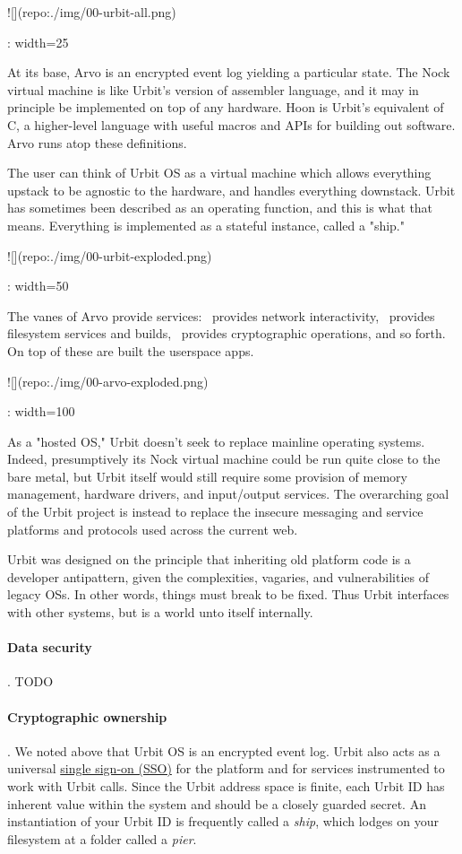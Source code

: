 ![](repo:./img/00-urbit-all.png){: width=25%

At its base, Arvo is an encrypted event log yielding a particular state.  The Nock virtual machine is like Urbit's version of assembler language, and it may in principle be implemented on top of any hardware.  Hoon is Urbit's equivalent of C, a higher-level language with useful macros and APIs for building out software.  Arvo runs atop these definitions.

The user can think of Urbit OS as a virtual machine which allows everything upstack to be agnostic to the hardware, and handles everything downstack.  Urbit has sometimes been described as an operating function, and this is what that means.  Everything is implemented as a stateful instance, called a "ship."

![](repo:./img/00-urbit-exploded.png){: width=50%

The vanes of Arvo provide services:  \ames~provides network interactivity, \clay~provides filesystem services and builds, \jael~provides cryptographic operations, and so forth.  On top of these are built the userspace apps.

![](repo:./img/00-arvo-exploded.png){: width=100%

As a "hosted OS," Urbit doesn't seek to replace mainline operating systems.  Indeed, presumptively its Nock virtual machine could be run quite close to the bare metal, but Urbit itself would still require some provision of memory management, hardware drivers, and input/output services.  The overarching goal of the Urbit project is instead to replace the insecure messaging and service platforms and protocols used across the current web.

Urbit was designed on the principle that inheriting old platform code is a developer antipattern, given the complexities, vagaries, and vulnerabilities of legacy OSs.  In other words, things must break to be fixed.  Thus Urbit interfaces with other systems, but is a world unto itself internally.

\paragraph{Data security}.  TODO

\paragraph{Cryptographic ownership}.  We noted above that Urbit OS is an encrypted event log.  Urbit also acts as a universal \href{https://en.wikipedia.org/wiki/Single_sign-on}{single sign-on (SSO)} for the platform and for services instrumented to work with Urbit calls.  Since the Urbit address space is finite, each Urbit ID has inherent value within the system and should be a closely guarded secret.  An instantiation of your Urbit ID is frequently called a \emph{ship}, which lodges on your filesystem at a folder called a \emph{pier}.

}}}
